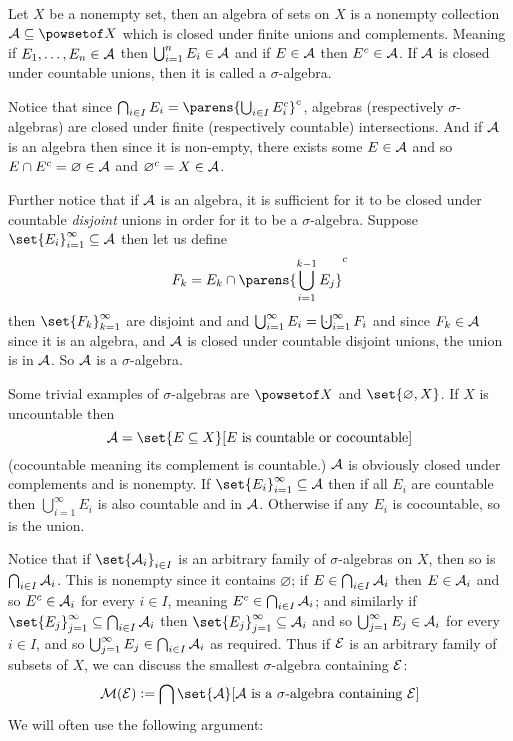 \bdefn

    Let $X$ be a nonempty set, then an {\emphcolor algebra} of sets on $X$ is a nonempty collection ${\cal A}\subseteq\powsetof X$ which is closed under finite unions and complements.
    Meaning if $E_1,\dots,E_n\in{\cal A}$ then $\bigcup_{i=1}^n E_i\in{\cal A}$ and if $E\in{\cal A}$ then $E^c\in{\cal A}$.
    If ${\cal A}$ is closed under countable unions, then it is called a {\emphcolor $\sigma$-algebra}.

\edefn

Notice that since $\bigcap_{i\in I}E_i=\parens{\bigcup_{i\in I}E_i^c}^c$, algebras (respectively $\sigma$-algebras) are closed under finite (respectively countable) intersections.
And if ${\cal A}$ is an algebra then since it is non-empty, there exists some $E\in{\cal A}$ and so $E\cap E^c=\varnothing\in{\cal A}$ and $\varnothing^c=X\in{\cal A}$.

Further notice that if ${\cal A}$ is an algebra, it is sufficient for it to be closed under countable {\it disjoint} unions in order for it to be a $\sigma$-algebra.
Suppose $\set{E_i}_{i=1}^\infty\subseteq{\cal A}$ then let us define
$$ F_k = E_k\cap\parens{\bigcup_{i=1}^{k-1}E_j}^c $$
then $\set{F_k}_{k=1}^\infty$ are disjoint and and $\bigcup_{i=1}^\infty E_i=\bigdcup_{i=1}^\infty F_i$ and since $F_k\in{\cal A}$ since it is an algebra, and ${\cal A}$ is closed under countable disjoint
unions, the union is in ${\cal A}$.
So ${\cal A}$ is a $\sigma$-algebra.

Some trivial examples of $\sigma$-algebras are $\powsetof X$ and $\set{\varnothing,X}$.
If $X$ is uncountable then
$$ {\cal A} = \set{E\subseteq X}[\hbox{$E$ is countable or cocountable}] $$
(cocountable meaning its complement is countable.)
${\cal A}$ is obviously closed under complements and is nonempty.
If $\set{E_i}_{i=1}^\infty\subseteq{\cal A}$ then if all $E_i$ are countable then $\bigcup_{i=1}^\infty E_i$ is also countable and in ${\cal A}$.
Otherwise if any $E_i$ is cocountable, so is the union.

Notice that if $\set{{\cal A}_i}_{i\in I}$ is an arbitrary family of $\sigma$-algebras on $X$, then so is $\bigcap_{i\in I}{\cal A}_i$.
This is nonempty since it contains $\varnothing$; if $E\in\bigcap_{i\in I}{\cal A}_i$ then $E\in{\cal A}_i$ and so $E^c\in{\cal A}_i$ for every $i\in I$, meaning $E^c\in\bigcap_{i\in I}{\cal A}_i$;
and similarly if $\set{E_j}_{j=1}^\infty\subseteq\bigcap_{i\in I}{\cal A}_i$ then $\set{E_j}_{j=1}^\infty\subseteq{\cal A}_i$ and so $\bigcup_{j=1}^\infty E_j\in{\cal A}_i$ for every $i\in I$, and so
$\bigcup_{j=1}^\infty E_j\in\bigcap_{i\in I}{\cal A}_i$ as required.
Thus if ${\cal E}$ is an arbitrary family of subsets of $X$, we can discuss the smallest $\sigma$-algebra containing ${\cal E}$:
$$ {\cal M}({\cal E}) \coloneqq \bigcap\set{{\cal A}}[\hbox{${\cal A}$ is a $\sigma$-algebra containing ${\cal E}$}] $$
We will often use the following argument:

